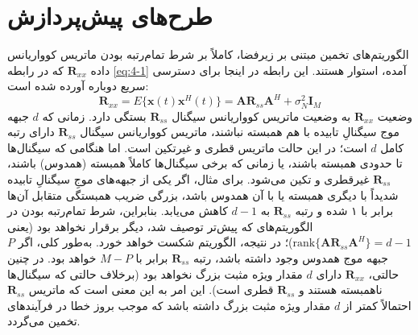 \section{طرح‌های پیش‌پردازش}
\label{sec:4-2}
الگوریتم‌های تخمین  مبتنی بر زیرفضا، کاملاً بر شرط تمام‌رتبه بودن ماتریس کوواریانس داده $\bm{R}_{xx}$ که در رابطه \eqref{eq:4-1} آمده، استوار هستند. این رابطه در اینجا برای دسترسی سریع دوباره آورده شده است:
\begin{equation}
	\bm{R}_{xx} = E\{\bm{x}(t)\bm{x}^H(t)\} = \bm{A}\bm{R}_{ss}\bm{A}^H + \sigma_N^2 \bm{I}_M
	\label{eq:4-1}
\end{equation}
وضعیت $\bm{R}_{xx}$ به وضعیت ماتریس کوواریانس سیگنال $\bm{R}_{ss}$ بستگی دارد. زمانی که $d$ جبهه موج سیگنالِ تابیده با هم همبسته نباشند، ماتریس کوواریانس سیگنال $\bm{R}_{ss}$ دارای رتبه کامل $d$ است؛ در این حالت ماتریس قطری و غیرتکین است. اما هنگامی که سیگنال‌ها تا حدودی همبسته باشند، یا زمانی که برخی سیگنال‌ها کاملاً همبسته (همدوس) باشند، $\bm{R}_{ss}$ غیرقطری و تکین می‌شود. برای مثال، اگر یکی از جبهه‌های موجِ سیگنالِ تابیده شدیداً با دیگری همبسته یا با آن همدوس باشد، بزرگی ضریب همبستگی متقابل آن‌ها برابر با ۱ شده و رتبه $\bm{R}_{ss}$ به $d-1$ کاهش می‌یابد. بنابراین، شرط تمام‌رتبه بودن در الگوریتم‌های  که پیش‌تر توصیف شد، دیگر برقرار نخواهد بود (یعنی $\text{rank}\{\bm{A}\bm{R}_{ss}\bm{A}^H\} = d - 1$)؛ در نتیجه، الگوریتم  شکست خواهد خورد. به‌طور کلی، اگر $P$ جبهه موج همدوس وجود داشته باشد، رتبه $\bm{R}_{ss}$ برابر با $M-P$ خواهد بود. در چنین حالتی، $\bm{R}_{xx}$ دارای $d$ مقدار ویژه مثبت بزرگ نخواهد بود (برخلاف حالتی که سیگنال‌ها ناهمبسته هستند و $\bm{R}_{ss}$ قطری است). این امر به این معنی است که ماتریس $\bm{R}_{ss}$ احتمالاً کمتر از $d$ مقدار ویژه مثبت بزرگ داشته باشد که موجب بروز خطا در فرآیندهای تخمین  می‌گردد.



